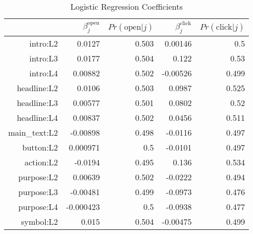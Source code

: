 \begin{table}[ht]
\centering
\caption{Logistic Regression Coefficients} 
\label{tab:logit_results}
\begin{tabular}{rrrrr}
  \hline
 & $\beta_j^{\text{open}}$ & $Pr(\text{open}|j)$ & $\beta_j^{\text{click}}$ & $Pr(\text{click}|j)$ \\ 
  \hline
\textsf{intro:L2} & 0.0127 & 0.503 & 0.00146 &  0.5 \\ 
  \textsf{intro:L3} & 0.0177 & 0.504 & 0.122 & 0.53 \\ 
  \textsf{intro:L4} & 0.00882 & 0.502 & -0.00526 & 0.499 \\ 
  \textsf{headline:L2} & 0.0106 & 0.503 & 0.0987 & 0.525 \\ 
  \textsf{headline:L3} & 0.00577 & 0.501 & 0.0802 & 0.52 \\ 
  \textsf{headline:L4} & 0.00837 & 0.502 & 0.0456 & 0.511 \\ 
  \textsf{main\_text:L2} & -0.00898 & 0.498 & -0.0116 & 0.497 \\ 
  \textsf{button:L2} & 0.000971 &  0.5 & -0.0101 & 0.497 \\ 
  \textsf{action:L2} & -0.0194 & 0.495 & 0.136 & 0.534 \\ 
  \textsf{purpose:L2} & 0.00639 & 0.502 & -0.0222 & 0.494 \\ 
  \textsf{purpose:L3} & -0.00481 & 0.499 & -0.0973 & 0.476 \\ 
  \textsf{purpose:L4} & -0.000423 &  0.5 & -0.0938 & 0.477 \\ 
  \textsf{symbol:L2} & 0.015 & 0.504 & -0.00475 & 0.499 \\ 
   \hline
\end{tabular}
\end{table}
